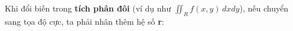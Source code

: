 \documentclass[preview]{standalone}
\begin{document}
\begin{center}
Khi đổi biến trong \textbf{tích phân đôi} (ví dụ như $\iint_R f(x, y) \, dxdy$), nếu chuyển sang tọa độ cực, ta phải nhân thêm hệ số\textbf{ r}:
\end{center}
\end{document}
